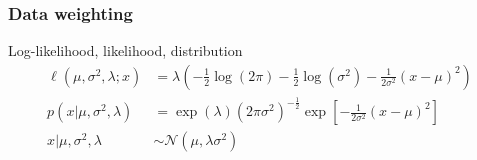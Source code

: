 \documentclass{beamer}
\begin{document}
\begin{frame}
\frametitle{Data weighting}

Log-likelihood, likelihood, distribution
\begin{align*}
  \ell (\mu, \sigma^2, \lambda; x) &= \lambda \left( -\frac{1}{2} \log (2 \pi) - \frac{1}{2}
  \log (\sigma^2) - \frac{1}{2 \sigma^2} (x - \mu)^2 \right)\\
  p(x|\mu, \sigma^2, \lambda) &= \exp(\lambda) \left( 2 \pi \sigma^2 \right)^{-\frac{1}{2}} \exp \left[ -\frac{1}{2
      \sigma^2} (x - \mu)^2 \right]\\
  x|\mu, \sigma^2, \lambda &\sim \mathcal{N} \left( \mu, \lambda \sigma^2 \right)
\end{align*}
\end{frame}

\end{document}
